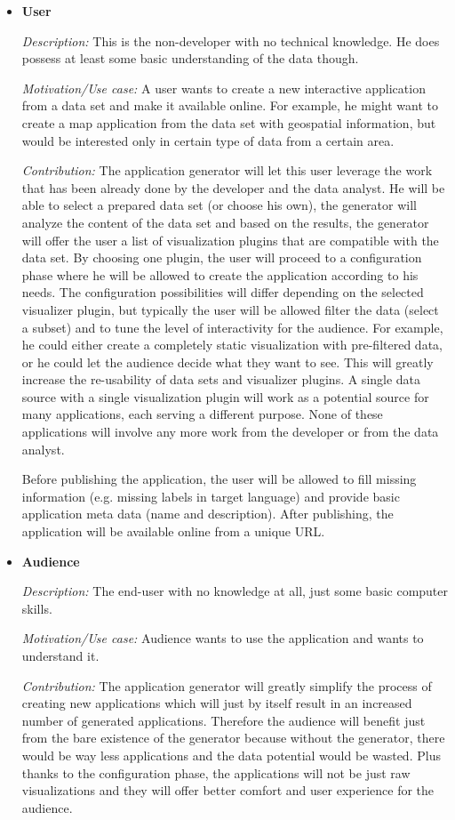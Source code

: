 \begin{itemize}
\item \textbf{User}

\textit{Description: }This is the non-developer with no technical knowledge. He does possess at least some basic understanding of the data though.

\textit{Motivation/Use case: }A user wants to create a new interactive application from a data set and make it available online. For example, he might want to create a map application from the data set with geospatial information, but would be interested only in certain type of data from a certain area.

\textit{Contribution: }The application generator will let this user leverage the work that has been already done by the developer and the data analyst. He will be able to select a prepared data set (or choose his own), the generator will analyze the content of the data set and based on the results, the generator will offer the user a list of visualization plugins that are compatible with the data set. By choosing one plugin, the user will proceed to a configuration phase where he will be allowed to create the application according to his needs. The configuration possibilities will differ depending on the selected visualizer plugin, but typically the user will be allowed filter the data (select a subset) and to tune the level of interactivity for the audience. For example, he could either create a completely static visualization with pre-filtered data, or he could let the audience decide what they want to see. This will greatly increase the re-usability of data sets and visualizer plugins. A single data source with a single visualization plugin will work as a potential source for many applications, each serving a different purpose. None of these applications will involve any more work from the developer or from the data analyst.

Before publishing the application, the user will be allowed to fill missing information (e.g. missing labels in target language) and provide basic application meta data (name and description). After publishing, the application will be available online from a unique URL.

\item \textbf{Audience}

\textit{Description:} The end-user with no knowledge at all, just some basic computer skills.

\textit{Motivation/Use case:} Audience wants to use the application and wants to understand it.

\textit{Contribution:} The application generator will greatly simplify the process of creating new applications which will just by itself result in an increased number of generated applications. Therefore the audience will benefit just from the bare existence of the generator because without the generator, there would be way less applications and the data potential would be wasted. Plus thanks to the configuration phase, the applications will not be just raw visualizations and they will offer better comfort and user experience for the audience.
\end{itemize}

